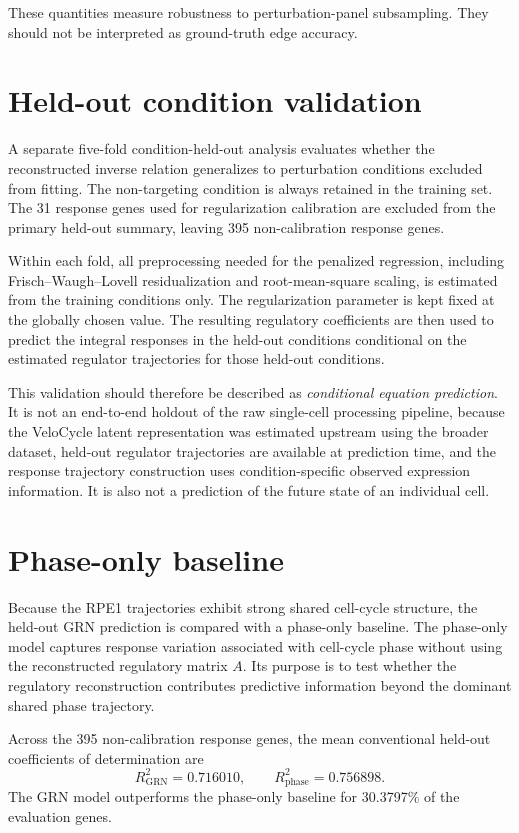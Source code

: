 \documentclass[supplement,onefignum,onetabnum]{siamart251216}
\begin{document}
These quantities measure robustness to perturbation-panel subsampling. They should not be interpreted as ground-truth edge accuracy.

\section{Held-out condition validation}

A separate five-fold condition-held-out analysis evaluates whether the reconstructed inverse relation generalizes to perturbation conditions excluded from fitting. The non-targeting condition is always retained in the training set. The 31 response genes used for regularization calibration are excluded from the primary held-out summary, leaving 395 non-calibration response genes.

Within each fold, all preprocessing needed for the penalized regression, including Frisch--Waugh--Lovell residualization and root-mean-square scaling, is estimated from the training conditions only. The regularization parameter is kept fixed at the globally chosen value. The resulting regulatory coefficients are then used to predict the integral responses in the held-out conditions conditional on the estimated regulator trajectories for those held-out conditions.

This validation should therefore be described as \emph{conditional equation prediction}. It is not an end-to-end holdout of the raw single-cell processing pipeline, because the VeloCycle latent representation was estimated upstream using the broader dataset, held-out regulator trajectories are available at prediction time, and the response trajectory construction uses condition-specific observed expression information. It is also not a prediction of the future state of an individual cell.

\section{Phase-only baseline}

Because the RPE1 trajectories exhibit strong shared cell-cycle structure, the held-out GRN prediction is compared with a phase-only baseline. The phase-only model captures response variation associated with cell-cycle phase without using the reconstructed regulatory matrix \(A\). Its purpose is to test whether the regulatory reconstruction contributes predictive information beyond the dominant shared phase trajectory.

Across the 395 non-calibration response genes, the mean conventional held-out coefficients of determination are
\[
R^2_{\mathrm{GRN}}=0.716010,
\qquad
R^2_{\mathrm{phase}}=0.756898.
\]
The GRN model outperforms the phase-only baseline for 30.3797\% of the evaluation genes.
\end{document}
